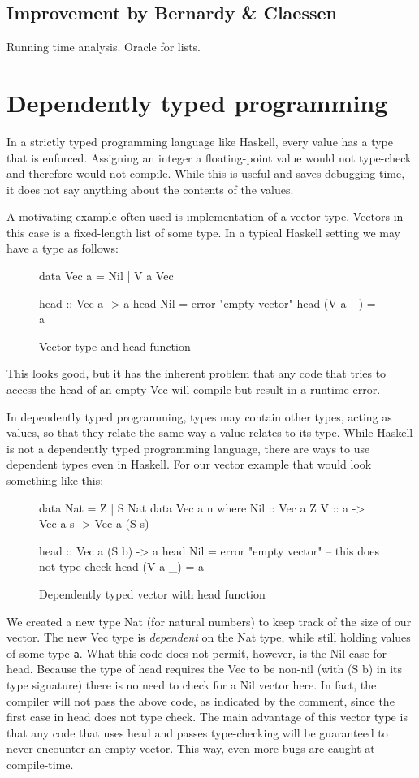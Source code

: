 \documentclass[a4paper,12pt,twosided]{report}
\begin{document}
\subsection{Improvement by Bernardy \& Claessen}
Running time analysis. Oracle for lists. 

\section{Dependently typed programming}
In a strictly typed programming language like Haskell, every value has a type
that is enforced. Assigning an integer a floating-point value would not
type-check and therefore would not compile. While this is useful and saves
debugging time, it does not say anything about the contents of the values.

A motivating example often used is implementation of a vector type. Vectors in
this case is a fixed-length list of some type. In a typical Haskell setting we 
may have a type as follows:
\begin{figure}[H]
\begin{code}
data Vec a = Nil | V a Vec

head :: Vec a -> a
head Nil = error "empty vector"
head (V a _) = a
\end{code}
\caption{Vector type and head function}
\end{figure}
This looks good, but it has the inherent problem that any code that tries to
access the head of an empty Vec will compile but result in a runtime error. 

In dependently typed programming, types may contain other types, acting as
values, so that they relate the same way a value relates to its type. While
Haskell is not a dependently typed programming language, there are ways to use
dependent types even in Haskell. For our vector example that would look
something like this:
\begin{figure}[H]
\begin{code}
data Nat = Z | S Nat
data Vec a n where
    Nil :: Vec a Z
    V :: a -> Vec a s -> Vec a (S s)

head :: Vec a (S b) -> a
head Nil = error "empty vector" -- this does not type-check
head (V a _) = a
\end{code}
\caption{Dependently typed vector with head function}
\end{figure}
We created a new type Nat (for natural numbers) to keep track of the size of our
vector. The new Vec type is \textit{dependent} on the Nat type, while still
holding values of some type \texttt{a}. What this code does not permit, however,
is the Nil case for head. Because the type of head requires the Vec to be
non-nil (with (S b) in its type signature) there is no need to check for a Nil
vector here. In fact, the compiler will not pass the above code, as indicated by
the comment, since the first case in head does not type check. The main
advantage of this vector type is that any code that uses head and passes
type-checking will be guaranteed to never encounter an empty vector.  This way,
even more bugs are caught at compile-time.
\end{document}
